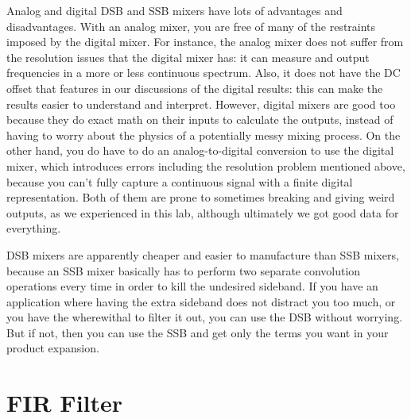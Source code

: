 \documentclass[11pt]{article}
\begin{document}
Analog and digital DSB and SSB mixers have lots of advantages and disadvantages. With an analog mixer, you are free of many of the restraints imposed by the digital mixer. For instance, the analog mixer does not suffer from the resolution issues that the digital mixer has: it can measure and output frequencies in a more or less continuous spectrum. Also, it does not have the DC offset that features in our discussions of the digital results: this can make the results easier to understand and interpret. However, digital mixers are good too because they do exact math on their inputs to calculate the outputs, instead of having to worry about the physics of a potentially messy mixing process. On the other hand, you do have to do an analog-to-digital conversion to use the digital mixer, which introduces errors including the resolution problem mentioned above, because you can't fully capture a continuous signal with a finite digital representation. Both of them are prone to sometimes breaking and giving weird outputs, as we experienced in this lab, although ultimately we got good data for everything. 

DSB mixers are apparently cheaper and easier to manufacture than SSB mixers, because an SSB mixer basically has to perform two separate convolution operations every time in order to kill the undesired sideband. If you have an application where having the extra sideband does not distract you too much, or you have the wherewithal to filter it out, you can use the DSB without worrying. But if not, then you can use the SSB and get only the terms you want in your product expansion. 

\section{FIR Filter}
\end{document}
